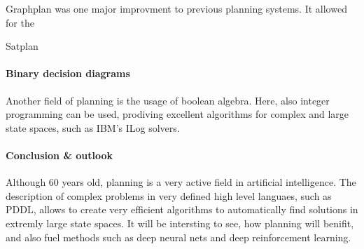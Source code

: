 \documentclass{article}
\begin{document}
Graphplan was one major improvment to previous planning systems. It allowed for the 

Satplan

\paragraph*{Binary decision diagrams}

Another field of planning is the usage of boolean algebra. Here, also integer programming can be used, prodiving excellent algorithms for complex and large state spaces, such as IBM's ILog solvers.

\paragraph*{Conclusion \& outlook}

Although 60 years old, planning is a very active field in artificial intelligence. The description of complex problems in very defined high level languaes, such as PDDL, allows to create very efficient algorithms to automatically find solutions in extremly large state spaces. It will be intersting to see, how planning will benifit, and also fuel methods such as deep neural nets and deep reinforcement learning.

\printbibliography
\end{document}
